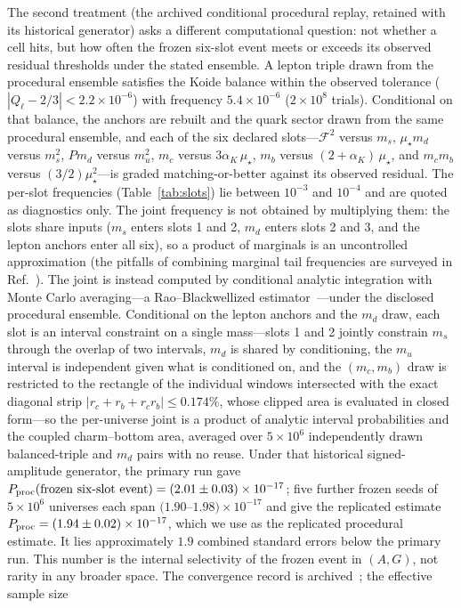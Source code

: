 \documentclass[aps,twocolumn,superscriptaddress,nofootinbib,floatfix]{revtex4-2}
\newcommand{\mstar}{\mu_\star}
\newcommand{\alphaK}{\alpha_K}
\begin{document}
The second treatment (the archived conditional procedural replay, retained with its historical generator) asks a different computational question: not whether a cell hits, but how often the frozen six-slot event meets or exceeds its observed residual thresholds under the stated ensemble. A lepton triple drawn from the procedural ensemble satisfies the Koide
balance within the observed tolerance ($|Q_\ell-2/3|<2.2\times10^{-6}$) with
frequency $5.4\times10^{-6}$ ($2\times10^8$ trials). Conditional on that
balance, the anchors are rebuilt and the quark sector drawn from the same procedural ensemble,
and each of the six declared slots---$\mathcal{F}^2$ versus $m_s$, $\mstar
m_d$ versus $m_s^2$, $P m_d$ versus $m_u^2$, $m_c$ versus $3\alphaK\,\mstar$,
$m_b$ versus $(2+\alphaK)\,\mstar$, and $m_c m_b$ versus $(3/2)\mstar^2$---is
graded matching-or-better against its observed residual. The per-slot frequencies (Table~\ref{tab:slots}) lie between $10^{-3}$
and $10^{-4}$ and are quoted as diagnostics only. The joint frequency is
not obtained by multiplying them: the slots share inputs ($m_s$ enters
slots 1 and 2, $m_d$ enters slots 2 and 3, and the lepton anchors enter
all six), so a product of marginals is an uncontrolled
approximation (the pitfalls of combining marginal tail frequencies
are surveyed in Ref.~\cite{Cousins2007}).
The joint is instead computed by conditional analytic integration with
Monte Carlo averaging---a Rao--Blackwellized
estimator~\cite{CasellaRobert1996}---under the disclosed procedural ensemble.
Conditional on the lepton anchors and the $m_d$ draw, each slot is an
interval constraint on a single mass---slots 1 and 2 jointly constrain
$m_s$ through the overlap of two intervals, $m_d$ is shared by
conditioning, the $m_u$ interval is independent
given what is conditioned on, and the $(m_c,m_b)$ draw is restricted to the
rectangle of the individual windows intersected with the exact diagonal strip
$|r_c+r_b+r_cr_b|\le0.174\%$, whose clipped area is evaluated in closed
form---so the per-universe joint is a product of analytic interval
probabilities and the coupled charm--bottom area, averaged over $5\times10^6$
independently drawn balanced-triple and $m_d$ pairs with no reuse. Under that historical signed-amplitude generator, the primary run gave
$P_{\rm proc}(\text{frozen six-slot event})=(2.01\pm0.03)\times10^{-17}$;
five further frozen seeds of $5\times10^6$ universes each span
$(1.90$--$1.98)\times10^{-17}$ and give the replicated estimate
$P_{\rm proc}=(1.94\pm0.02)\times10^{-17}$,
which we use as the replicated procedural estimate. It lies approximately $1.9$ combined standard errors below the primary run. This number is the internal selectivity of the frozen event in $(A,G)$, not rarity in any broader space. The convergence record is archived~\cite{BrilliantGitHubEnum}; the effective sample size
\end{document}
